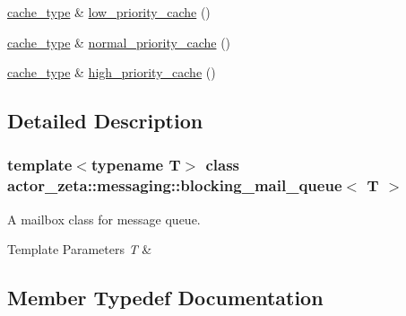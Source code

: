 \begin{DoxyCompactItemize}
\item 
\hyperlink{classactor__zeta_1_1messaging_1_1blocking__mail__queue_a20156eef06b0a688ceeb663097a90862}{cache\+\_\+type} \& \hyperlink{classactor__zeta_1_1messaging_1_1blocking__mail__queue_a0840f187c44e717bb1078cdd38f2aaf7}{low\+\_\+priority\+\_\+cache} ()
\item 
\hyperlink{classactor__zeta_1_1messaging_1_1blocking__mail__queue_a20156eef06b0a688ceeb663097a90862}{cache\+\_\+type} \& \hyperlink{classactor__zeta_1_1messaging_1_1blocking__mail__queue_abd039cc803849fd87da17a18171a0440}{normal\+\_\+priority\+\_\+cache} ()
\item 
\hyperlink{classactor__zeta_1_1messaging_1_1blocking__mail__queue_a20156eef06b0a688ceeb663097a90862}{cache\+\_\+type} \& \hyperlink{classactor__zeta_1_1messaging_1_1blocking__mail__queue_ad68ddf70deb082f37a154186c75f82bd}{high\+\_\+priority\+\_\+cache} ()
\end{DoxyCompactItemize}


\subsection{Detailed Description}
\subsubsection*{template$<$typename T$>$\newline
class actor\+\_\+zeta\+::messaging\+::blocking\+\_\+mail\+\_\+queue$<$ T $>$}

A mailbox class for message queue. 


\begin{DoxyTemplParams}{Template Parameters}
{\em T} & \\
\hline
\end{DoxyTemplParams}


\subsection{Member Typedef Documentation}
\mbox{\label{classactor__zeta_1_1messaging_1_1blocking__mail__queue_a20156eef06b0a688ceeb663097a90862}} 
